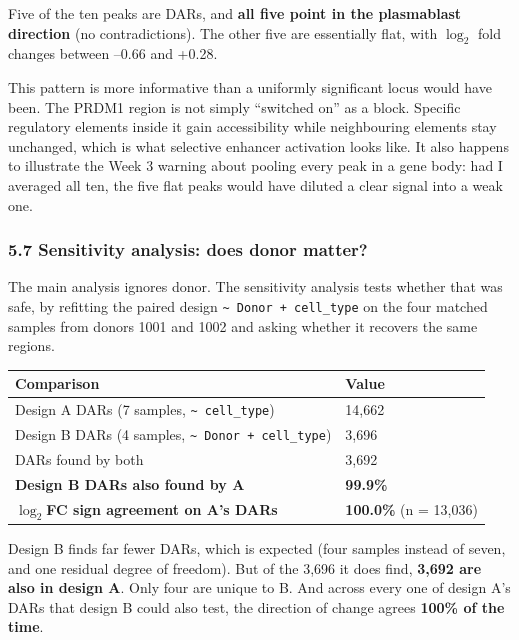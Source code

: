 \documentclass[
  11pt,
  a4paper,
]{article}
\begin{document}
Five of the ten peaks are DARs, and \textbf{all five point in the
plasmablast direction} (no contradictions). The other five are
essentially flat, with \(\log_2\) fold changes between --0.66 and +0.28.

This pattern is more informative than a uniformly significant locus
would have been. The PRDM1 region is not simply ``switched on'' as a
block. Specific regulatory elements inside it gain accessibility while
neighbouring elements stay unchanged, which is what selective enhancer
activation looks like. It also happens to illustrate the Week 3 warning
about pooling every peak in a gene body: had I averaged all ten, the
five flat peaks would have diluted a clear signal into a weak one.

\hypertarget{sensitivity-analysis-does-donor-matter}{%
\subsubsection{5.7 Sensitivity analysis: does donor
matter?}\label{sensitivity-analysis-does-donor-matter}}

The main analysis ignores donor. The sensitivity analysis tests whether
that was safe, by refitting the paired design
\texttt{\textasciitilde{}\ Donor\ +\ cell\_type} on the four matched
samples from donors 1001 and 1002 and asking whether it recovers the
same regions.

\begin{longtable}[]{@{}ll@{}}
\toprule\noalign{}
Comparison & Value \\
\midrule\noalign{}
\endhead
\bottomrule\noalign{}
\endlastfoot
Design A DARs (7 samples, \texttt{\textasciitilde{}\ cell\_type}) &
14,662 \\
Design B DARs (4 samples,
\texttt{\textasciitilde{}\ Donor\ +\ cell\_type}) & 3,696 \\
DARs found by both & 3,692 \\
\textbf{Design B DARs also found by A} & \textbf{99.9\%} \\
\textbf{\(\log_2\)FC sign agreement on A's DARs} & \textbf{100.0\%} (n =
13,036) \\
\end{longtable}

Design B finds far fewer DARs, which is expected (four samples instead
of seven, and one residual degree of freedom). But of the 3,696 it does
find, \textbf{3,692 are also in design A}. Only four are unique to B.
And across every one of design A's DARs that design B could also test,
the direction of change agrees \textbf{100\% of the time}.
\end{document}
